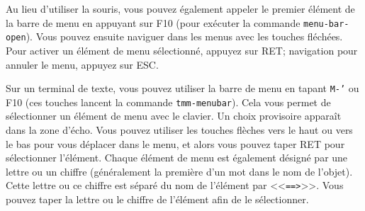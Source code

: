 Au lieu d'utiliser la souris, vous pouvez également appeler le premier
élément de la barre de menu en appuyant sur F10 (pour exécuter la
commande \texttt{menu-bar-open}). Vous pouvez ensuite naviguer dans
les menus avec les touches fléchées. Pour activer un élément de menu
sélectionné, appuyez sur RET; navigation pour annuler le menu, appuyez
sur ESC. \par

Sur un terminal de texte, vous pouvez utiliser la barre de menu en
tapant \texttt{M-'} ou F10 (ces touches lancent la commande
\texttt{tmm-menubar}). Cela vous permet de sélectionner un élément de
menu avec le clavier. Un choix provisoire apparaît dans la zone
d'écho. Vous pouvez utiliser les touches flèches vers le haut ou vers
le bas pour vous déplacer dans le menu, et alors vous pouvez taper RET
pour sélectionner l'élément. Chaque élément de menu est également
désigné par une lettre ou un chiffre (généralement la première d'un
mot dans le nom de l'objet). Cette lettre ou ce chiffre est séparé du
nom de l'élément par <<\texttt{==>}>>. Vous pouvez taper la lettre ou
le chiffre de l'élément afin de le sélectionner.\par 